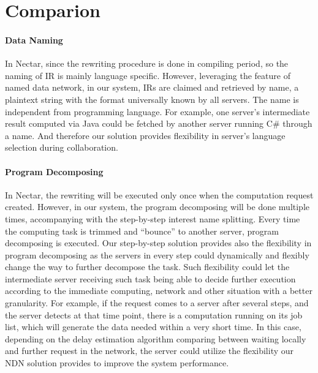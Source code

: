 \section{Comparion}
 
\paragraph{Data Naming}
In Nectar, since the rewriting procedure is done in compiling period, so the naming of IR is mainly language specific. However, leveraging the feature of named data network, in our system, IRs are claimed and retrieved by name, a plaintext string with the format universally known by all servers. The name is independent from programming language. For example, one server’s intermediate result computed via Java could be fetched by another server running C# through a name. And therefore our solution provides flexibility in server’s language selection during collaboration.
 
\paragraph{Program Decomposing}
In Nectar, the rewriting will be executed only once when the computation request created. However, in our system, the program decomposing will be done multiple times, accompanying with the step-by-step interest name splitting.  Every time the computing task is trimmed and “bounce” to another server, program decomposing is executed. Our step-by-step solution provides also the flexibility in program decomposing as the servers in every step could dynamically and flexibly change the way to further decompose the task. Such flexibility could let the intermediate server receiving such task being able to decide further execution according to the immediate computing, network and other situation with a better granularity. For example, if the request comes to a server after several steps, and the server detects at that time point, there is a computation running on its job list, which will generate the data needed within a very short time. In this case, depending on the delay estimation algorithm comparing between waiting locally and further request in the network, the server could utilize the flexibility our NDN solution provides to improve the system performance.
 
